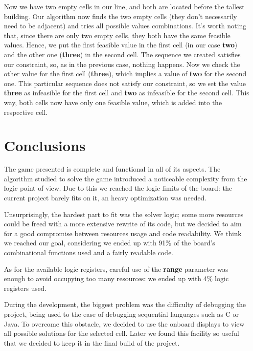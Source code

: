 \documentclass[12pt]{report}
\begin{document}
Now we have two empty cells in our line, and both are located before the tallest
building. Our algorithm now finds the two empty cells (they don't necessarily need
to be adjacent) and tries all possible values combinations. It's worth noting that,
since there are only two empty cells, they both have the same feasible values. Hence,
we put the first feasible value in the first cell (in our case \textbf{two}) and
the other one (\textbf{three}) in the second cell. The sequence we created
satisfies our constraint, so, as in the previous case, nothing happens. Now
we check the other value for the first cell (\textbf{three}), which implies a
value of \textbf{two} for the second one. This particular sequence does not
satisfy our constraint, so we set the value \textbf{three} as infeasible for
the first cell and \textbf{two} as infeasible for the second cell. This way,
both cells now have only one feasible value, which is added into the respective
cell.

\chapter*{Conclusions}

The game presented is complete and functional in all of its aspects. The
algorithm studied to solve the game introduced a noticeable complexity
from the logic point of view. Due to this we reached the logic limits of
the board: the current project barely fits on it, an heavy optimization
was needed.

Unsurprisingly, the hardest part to fit was the solver logic; some more
resources could be freed with a more extensive rewrite of its code, but we
decided to aim for a good compromise between resources usage and code readability.
We think we reached our goal, considering we ended up with 91\% of the board's
combinational functions used and a fairly readable code.

As for the available logic registers, careful use of the \textbf{range} parameter
was enough to avoid occupying too many resources: we ended up with 4\% logic
registers used.

During the development, the biggest problem was the difficulty of debugging the
project, being used to the ease of debugging sequential languages such as C or Java.
To overcome this obstacle, we decided to use the onboard displays to view all
possible solutions for the selected cell. Later we found this facility so useful
that we decided to keep it in the final build of the project.
\end{document}
